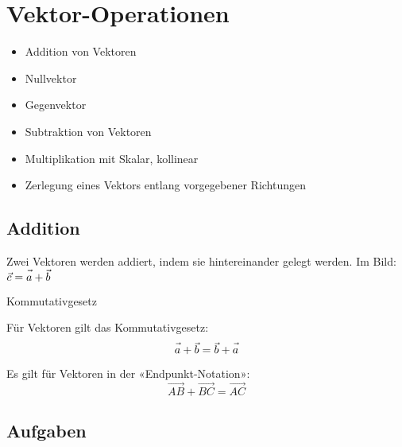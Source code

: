 
\section{Vektor-Operationen}

\begin{itemize}
\item Addition von Vektoren
\item Nullvektor
\item Gegenvektor
\item Subtraktion von Vektoren
\item Multiplikation mit Skalar, kollinear
\item Zerlegung eines Vektors entlang vorgegebener Richtungen
\end{itemize}

\newpage

\subsection{Addition}

Zwei Vektoren werden addiert, indem sie hintereinander gelegt
werden. Im Bild: $\vec{c} = \vec{a\vphantom{b}} + \vec{b}$


\begin{gesetz}{Kommutativgesetz}{}

  Für Vektoren gilt das Kommutativgesetz:
  $$\vec{a\vphantom{b}} + \vec{b} = \vec{b} + \vec{a\vphantom{b}}$$
  \end{gesetz}

\begin{bemerkung}{}{}
  Es gilt für Vektoren in der «Endpunkt-Notation»:
  $$\overrightarrow{AB} + \overrightarrow{BC} = \overrightarrow{AC}$$
\end{bemerkung}


\subsection*{Aufgaben}


